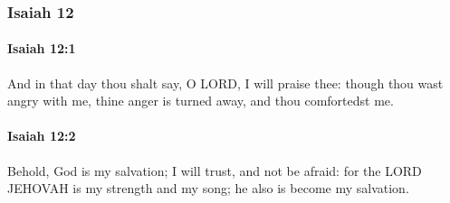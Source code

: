 	\subsubsection{Isaiah 12} %
		\label{ISAIAH-12}

		\paragraph{Isaiah 12:1} %
			\label{ISAIAH-12-1}

			And in that day thou shalt say, O LORD, I will praise thee: though thou wast angry with me, thine anger is turned away, and thou comfortedst me.


		\paragraph{Isaiah 12:2} %
			\label{ISAIAH-12-2}

			Behold, God is my salvation; I will trust, and not be afraid: for the LORD JEHOVAH is my strength and my song; he also is become my salvation.

